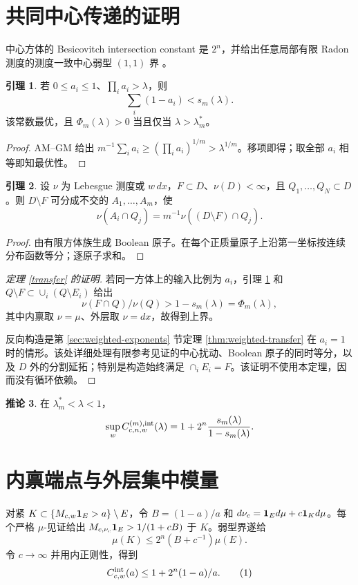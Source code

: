 \documentclass[UTF8,11pt,fontset=none]{ctexart}
\theoremstyle{definition}\newtheorem{theorem}{定理}[section]\newtheorem{lemma}[theorem]{引理}\newtheorem{corollary}[theorem]{推论}\newtheorem{proposition}[theorem]{命题}
\theoremstyle{remark}\newtheorem{remark}[theorem]{说明}
\begin{document}
\section{共同中心传递的证明}
中心方体的 Besicovitch intersection constant 是 $2^n$，并给出任意局部有限 Radon 测度的测度一致中心弱型 $(1,1)$ 界 \cite[Theorem 1.2 and Corollary 3.5]{Aldaz2020}。
\begin{lemma}\label{deficit}若 $0\le a_i\le1$、$\prod_ia_i>\lambda$，则
\[\sum_i(1-a_i)<s_m(\lambda).\]
该常数最优，且 $\Phi_m(\lambda)>0$ 当且仅当 $\lambda>\lambda_m^*$。
\end{lemma}
\begin{proof}AM--GM 给出 $m^{-1}\sum_ia_i\ge(\prod_ia_i)^{1/m}>\lambda^{1/m}$。移项即得；取全部 $a_i$ 相等即知最优性。\end{proof}
\begin{lemma}\label{split}设 $\nu$ 为 Lebesgue 测度或 $w\,dx$，$F\subset D$、$\nu(D)<\infty$，且 $Q_1,\ldots,Q_N\subset D$。则 $D\setminus F$ 可分成不交的 $A_1,\ldots,A_m$，使
\[\nu(A_i\cap Q_j)=m^{-1}\nu((D\setminus F)\cap Q_j).\]
\end{lemma}
\begin{proof}由有限方体族生成 Boolean 原子。在每个正质量原子上沿第一坐标按连续分布函数等分；逐原子求和。\end{proof}
\begin{proof}[定理 \ref{transfer} 的证明]
若同一方体上的输入比例为 $a_i$，引理 \ref{deficit} 和 $Q\setminus F\subset\cup_i(Q\setminus E_i)$ 给出
\[\nu(F\cap Q)/\nu(Q)>1-s_m(\lambda)=\Phi_m(\lambda),\]
其中内禀取 $\nu=\mu$、外层取 $\nu=dx$，故得到上界。

反向构造是第 \ref{sec:weighted-exponents} 节定理 \ref{thm:weighted-transfer} 在 $a_i=1$ 时的情形。该处详细处理有限参考见证的中心扰动、Boolean 原子的同时等分，以及 $D$ 外的分割延拓；特别是构造始终满足 $\cap_iE_i=F$。该证明不使用本定理，因而没有循环依赖。\end{proof}
\begin{corollary}在 $\lambda_m^*<\lambda<1$，
\[\sup_wC^{(m),\rm int}_{c,n,w}(\lambda)=1+2^n\frac{s_m(\lambda)}{1-s_m(\lambda)}.\]
\end{corollary}
\section{内禀端点与外层集中模量}
对紧 $K\subset\{M_{c,w}\mathbf 1_E>a\}\setminus E$，令 $B=(1-a)/a$ 和 $d\nu_c=\mathbf 1_Ed\mu+c\mathbf 1_Kd\mu$。每个严格 $\mu$-见证给出 $M_{c,\nu_c}\mathbf 1_E>1/(1+cB)$ 于 $K$。弱型界遂给
\[\mu(K)\le2^n(B+c^{-1})\mu(E).\]
令 $c\to\infty$ 并用内正则性，得到
\[C^{\rm int}_{c,w}(a)\le1+2^n(1-a)/a.\tag{1}\]
\end{document}
